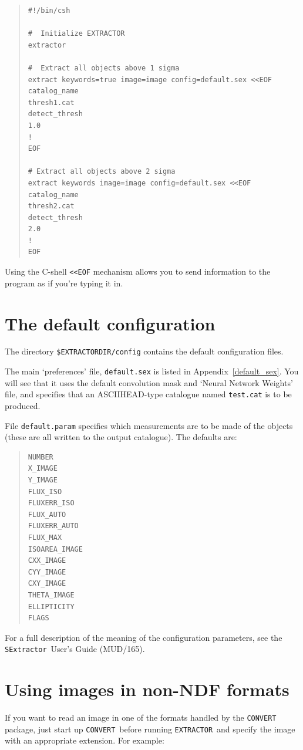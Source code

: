 \documentclass[twoside,11pt]{article}
\newcommand{\htmladdnormallink}[2]{#1}
\newcommand{\latex}[1]{#1}
\newcommand{\latexhtml}[2]{#1}
\newcommand{\xref}[3]{#1}
\newcommand{\xlabel}[1]{}
\renewcommand{\_}{\texttt{\symbol{95}}}
\newcommand{\EXTRACTOR}{\texttt{EXTRACTOR}}
\newcommand{\CONVERT}{\texttt{CONVERT}}
\newcommand{\SExtractor}{\texttt{SExtractor}}
\newcommand{\MUD}{mud165.ps}
\begin{document}
\newpage
\begin{center}
\latexhtml{}{\textbf{Example batch script}}
\end{center}
\begin{quote} \begin{verbatim}
#!/bin/csh

#  Initialize EXTRACTOR
extractor

#  Extract all objects above 1 sigma
extract keywords=true image=image config=default.sex <<EOF
catalog_name
thresh1.cat
detect_thresh
1.0
!
EOF

# Extract all objects above 2 sigma
extract keywords image=image config=default.sex <<EOF
catalog_name
thresh2.cat
detect_thresh
2.0
!
EOF
\end{verbatim} \end{quote}
Using the C-shell \verb+<<EOF+ mechanism allows you to send
information to the program as if you're typing it in.


\section{\xlabel{the_default_configuration}\label{defaults}\xlabel{defaults}The default configuration}

The directory \texttt{\$EXTRACTOR\_DIR/config} contains the default
configuration files.

The main `preferences' file, \texttt{default.sex} is listed in
Appendix~\ref{default_sex}.
You will see that it uses the default convolution mask and `Neural Network
Weights' file, and specifies that an ASCII\_HEAD-type catalogue named
\texttt{test.cat} is to be produced.

File \texttt{default.param} specifies which measurements are to be
made of the objects (these are all written to the output
catalogue). The defaults are:
\begin{quote}\begin{verbatim}
NUMBER
X_IMAGE
Y_IMAGE
FLUX_ISO
FLUXERR_ISO
FLUX_AUTO
FLUXERR_AUTO
FLUX_MAX
ISOAREA_IMAGE
CXX_IMAGE
CYY_IMAGE
CXY_IMAGE
THETA_IMAGE
ELLIPTICITY
FLAGS
\end{verbatim}\end{quote}

For a full description of the meaning of the configuration parameters, see
the
\htmladdnormallink{\SExtractor\ User's Guide}{\MUD}\latex{ (MUD/165)}.

\section{\xlabel{using_images_in_nonndf_formats}Using images in non-NDF formats}
If you want to read an image in one of the
\xref{formats handled by the
\CONVERT}{sun55}{the_default_conversion_commands} package,
just start up \CONVERT\ before running \EXTRACTOR\ and specify the image with
an appropriate extension. For example:
\end{document}
